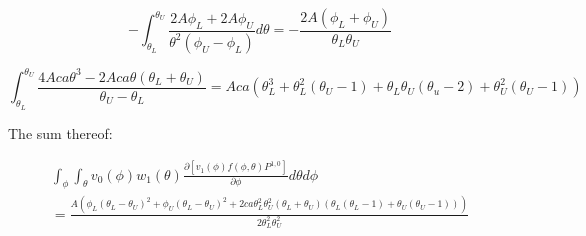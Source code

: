 \documentclass[12pt,a4paper,pagesize=pdftex]{scrartcl}
\begin{document}
\begin{equation*}
    - \int_{\theta_L}^{\theta_U} \frac{2 A \phi_L + 2 A \phi_U}{\theta^2 \left(\phi_U - \phi_L\right)} d\theta = - \frac{2 A \left(\phi_L + \phi_U\right)}{\theta_L \theta_U}
\end{equation*}

\begin{equation*}
    \int_{\theta_L}^{\theta_U} \frac{4 A c a \theta^3 - 2 A c a \theta \left(\theta_L + \theta_U\right)}{\theta_U - \theta_L} = A c a \left(\theta_L^3 + \theta_L^2 \left(\theta_U - 1\right) + \theta_L \theta_U \left(\theta_u - 2\right) + \theta_U^2\left(\theta_U - 1\right)\right)
\end{equation*}

The sum thereof:

\begin{multline*}
    \int_\phi \int_\theta v_0\left(\phi\right) w_1\left(\theta\right) \frac{\partial \left[v_1\left(\phi\right) f\left(\phi, \theta\right) P^{1,0}\right]}{\partial \phi} d\theta d\phi \\
    = \frac{A \left(\phi_L \left(\theta_L - \theta_U\right)^2 + \phi_U \left(\theta_L - \theta_U\right)^2 + 2 c a \theta_L^2 \theta_U^2 \left(\theta_L + \theta_U\right)\left(\theta_L\left(\theta_L - 1\right) + \theta_U \left(\theta_U - 1\right)\right)\right)}{2 \theta_L^2 \theta_U^2}
\end{multline*}
\end{document}
